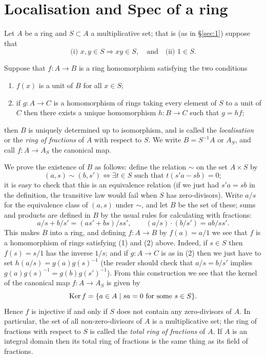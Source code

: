 \section{Localisation and Spec of a ring}\label{sec:4}

Let $A$ be a ring and $S \subset A$ a multiplicative set; that is (as in
\S\ref{sec:1}) suppose that
\[
  \text{(i) } x, y \in S \Rightarrow xy \in S, \quad \text{and} \quad \text{(ii) } 1 \in S.
\]

\begin{definition}
Suppose that $f\colon A \to B$ is a ring homomorphism satisfying
the two conditions
\begin{enumerate}[(1)]
  \item $f(x)$ is a unit of $B$ for all $x \in S$;
  \item if $g\colon A \to C$ is a homomorphism of rings taking every element of $S$ to
        a unit of $C$ then there exists a unique homomorphism
        $h\colon B \to C$ such that $g = hf$;
\end{enumerate}
then $B$ is uniquely determined up to isomorphism, and is called the
\emph{localisation} or the \emph{ring of fractions} of $A$ with respect to $S$. We write
$B = S^{-1}A$ or $A_S$, and call $f\colon A \to A_S$ the canonical map.
\end{definition}

We prove the existence of $B$ as follows: define the relation $\sim$ on the
set $A \times S$ by
\[
  (a, s) \sim (b, s') \iff \exists t \in S \text{ such that } t(s'a - sb) = 0;
\]
it is easy to check that this is an equivalence relation (if we just had
$s'a = sb$ in the definition, the transitive law would fail when $S$ has
zero-divisors). Write $a/s$ for the equivalence class of $(a, s)$ under $\sim$, and
let $B$ be the set of these; sums and products are defined in $B$ by the usual
rules for calculating with fractions:
\[
  a/s + b/s' = (as' + bs)/ss', \qquad (a/s) \cdot (b/s') = ab/ss'.
\]
This makes $B$ into a ring, and defining $f\colon A \to B$ by $f(a) = a/1$ we see that
$f$ is a homomorphism of rings satisfying (1) and (2) above. Indeed, if $s \in S$
then $f(s) = s/1$ has the inverse $1/s$; and if $g\colon A \to C$ is as in (2) then we just
have to set $h(a/s) = g(a)g(s)^{-1}$ (the reader should check that $a/s = b/s'$
implies $g(a)g(s)^{-1} = g(b)g(s')^{-1}$). From this construction we see that the
kernel of the canonical map $f\colon A \to A_S$ is given by
\[
  \operatorname{Ker} f = \{a \in A \mid sa = 0 \text{ for some } s \in S\}.
\]
Hence $f$ is injective if and only if $S$ does not contain any zero-divisors
of $A$. In particular, the set of all non-zero-divisors of $A$ is a multiplicative
set; the ring of fractions with respect to $S$ is called the \emph{total ring of fractions}
of $A$. If $A$ is an integral domain then its total ring of fractions is the same
thing as its field of fractions.

